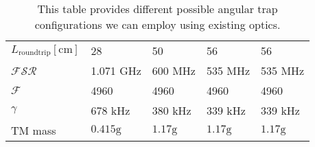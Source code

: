 \begin{table}
\begin{center}
\begin{tabular}{|l|l|l|l|l|}
$L_\mathrm{roundtrip}[\mathrm{cm}]$ & 28& 50        & 56     & 56 \\
$\mathcal{FSR}$ & 1.071 GHz  & 600 MHz     & 535 MHz  & 535 MHz \\
$\mathcal{F}$ & 4960         & 4960        & 4960     & 4960 \\
$\gamma$ & 678 kHz           & 380 kHz     & 339 kHz  & 339 kHz \\
\hline
TM mass  & $0.415\mathrm{g}$ & $1.17\mathrm{g}$ & $1.17\mathrm{g}$ & $1.17\mathrm{g}$ \\
\hline
\end{tabular}
\end{center}
\caption[Angular Trap Parameters']{This table provides different possible
    angular trap configurations we can employ using existing optics.}
\label{tab:angleparams}
\end{table}



